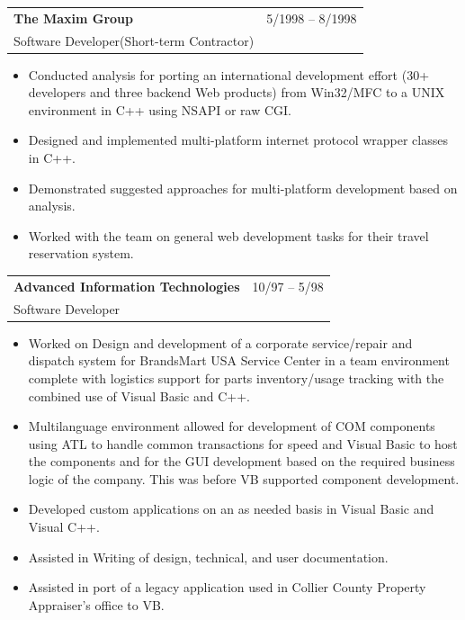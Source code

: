 \documentclass[10pt]{report}
\begin{document}
\noindent
\begin{tabular}{ L{.5\textwidth}  R{.4\textwidth} }
\textbf{\large The Maxim Group}  & 5/1998 -- 8/1998 \\
Software Developer(Short-term Contractor) &
\end{tabular}

\begin{itemize}
\item Conducted analysis for porting an international development effort (30+ developers and three backend Web products) from Win32/MFC to a UNIX environment in C++ using NSAPI or raw CGI.
\item Designed and implemented multi-platform internet protocol wrapper classes in C++.
\item Demonstrated suggested approaches for multi-platform development based on analysis.
\item Worked with the team on general web development tasks for their travel reservation system.
\end{itemize}
\bigskip

\pagebreak

\noindent
\begin{tabular}{ L{.5\textwidth}  R{.4\textwidth} }
\textbf{\large Advanced Information Technologies}  & 10/97 -- 5/98 \\
Software Developer &
\end{tabular}

\begin{itemize}
\item Worked on Design and development of a corporate service/repair and dispatch system for BrandsMart USA Service Center in a team environment complete with logistics support for parts inventory/usage tracking with the combined use of Visual Basic and C++.
\item Multilanguage environment allowed for development of COM components using ATL to handle common transactions for speed and Visual Basic to host the components and for the GUI development based on the required business logic of the company.  This was before VB supported component development.
\item Developed custom applications on an as needed basis in Visual Basic and Visual C++.
\item Assisted in Writing of design, technical, and user documentation.
\item Assisted in port of a legacy application used in Collier County Property Appraiser’s office to VB.
\end{itemize}
\bigskip
\end{document}
